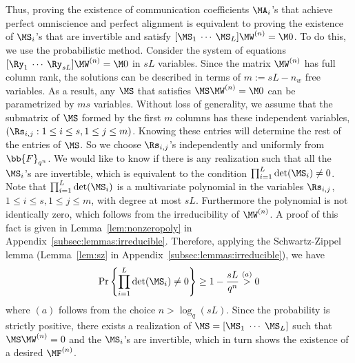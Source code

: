 Thus, proving the existence of communication coefficients $\MA_i$'s  that achieve perfect omniscience and perfect alignment is equivalent to proving the existence of  $\MS_i$'s  that are invertible and satisfy $[\MS_1\:\cdots\: \MS_L]\MW^{(n)} =\M0$. To do this, we use the probabilistic method.  Consider the system of equations $[\Ry_1\:\cdots\:\Ry_{sL}]\MW^{(n)} =\M0$ in $sL$ variables. Since the matrix $\MW^{(n)}$ has full column rank, the solutions can be described in terms of  $m:=sL- n_w$ free variables. As a result, any $\MS$ that satisfies $\MS\MW^{(n)}=\M0$ can be parametrized by $ms$ variables. Without loss of generality, we assume that the submatrix of $\MS$ formed by the first $m$ columns has these independent variables, $(\Rs_{i,j}: 1\leq i \leq s, 1 \leq j \leq m)$. Knowing these entries will determine the rest of the entries of $\MS$.  So we choose $\Rs_{i,j}$'s independently and uniformly from $\bb{F}_{q^n}$.  We would like to know if there is any realization such that all the $\MS_i$'s are invertible, which is equivalent to the condition $\prod_{i=1}^{L} \det(\MS_i)\neq 0$. Note that $\prod_{i=1}^{L} \det(\MS_i)$ is a multivariate polynomial in the variables $\Rs_{i,j}$, $1\leq i \leq s, 1 \leq j \leq m$, with degree at most $sL$. Furthermore the polynomial is not identically zero, which follows from the irreducibility of $\MW^{(n)}$. A proof of this fact is given in  Lemma~\ref{lem:nonzeropoly} in  Appendix~\ref{subsec:lemmas:irreducible}. Therefore, applying the  Schwartz-Zippel lemma (Lemma~\ref{lem:sz} in Appendix~\ref{subsec:lemmas:irreducible}), we have
\begin{align*}
 \Pr\left\lbrace \prod_{i=1}^{L} \det(\MS_i)\neq 0\right\rbrace \geq 1- \frac{sL}{q^n} \stackrel{(a)}{>} 0 \\
\end{align*}  
where $(a)$ follows from the choice $n > \log_q(sL)$.  Since the probability is strictly positive, there exists a realization of $\MS= [\MS_1 \;  \cdots \; \MS_L]$ such that $\MS \MW^{(n)} = 0$ and the $\MS_i$'s are invertible, which in turn shows the existence of a desired $\MF^{(n)}$.

